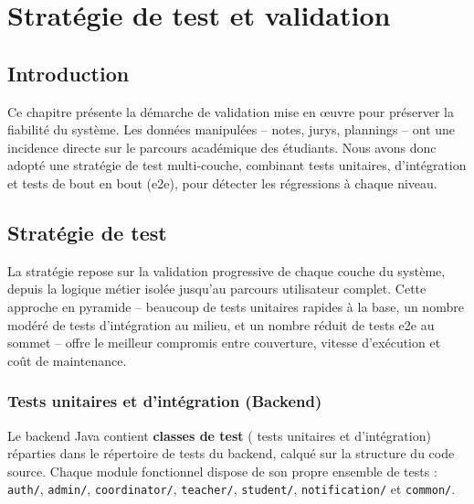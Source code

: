 \newpage
\section{Stratégie de test et validation}
\label{ch5}

\subsection{Introduction}
\label{ch5:intro}

Ce chapitre présente la démarche de validation mise en œuvre pour préserver la fiabilité du système. Les données manipulées -- notes, jurys, plannings -- ont une incidence directe sur le parcours académique des étudiants. Nous avons donc adopté une stratégie de test multi-couche, combinant tests unitaires, d'intégration et tests de bout en bout (\acrshort{e2e}), pour détecter les régressions à chaque niveau.

\subsection{Stratégie de test}
\label{ch5:strategie}

La stratégie repose sur la validation progressive de chaque couche du système, depuis la logique métier isolée jusqu'au parcours utilisateur complet. Cette approche en pyramide -- beaucoup de tests unitaires rapides à la base, un nombre modéré de tests d'intégration au milieu, et un nombre réduit de tests \acrshort{e2e} au sommet -- offre le meilleur compromis entre couverture, vitesse d'exécution et coût de maintenance.

\subsubsection{Tests unitaires et d'intégration (Backend)}
\label{ch5:backend_tests}

Le backend Java contient \textbf{ classes de test} ( tests unitaires et d'intégration) réparties dans le répertoire de tests du backend, calqué sur la structure du code source. Chaque module fonctionnel dispose de son propre ensemble de tests : \texttt{auth/}, \texttt{admin/}, \texttt{coordinator/}, \texttt{teacher/}, \texttt{student/}, \texttt{notification/} et \texttt{common/}.

